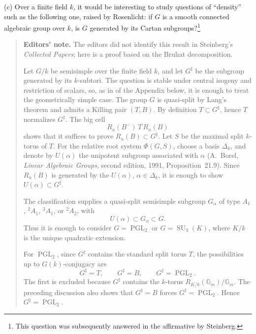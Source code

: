 \textup{(c)} Over a finite field \(k\), it would be interesting
to study questions of ``density'' such as the following one,
raised by Rosenlicht: if \(G\) is a smooth connected algebraic
group over \(k\), is \(G\) generated by its Cartan
subgroups?\footnote{This question was subsequently answered in
the affirmative by Steinberg.}

\begin{quote}\small
\textbf{Editors' note.}
The editors did not
identify this result in Steinberg's \emph{Collected Papers}; here
is a proof based on the Bruhat decomposition.

Let \(G/k\) be semisimple over the finite field \(k\), and let
\(G^\sharp\) be the subgroup generated by its \(k\)-subtori. The
question is stable under central isogeny and restriction of
scalars, so, as in  of the Appendix below, it is enough to
treat the geometrically simple case. The group \(G\) is
quasi-split by Lang's theorem and admits a Killing pair
\((T,B)\). By definition \(T\subset G^\sharp\), hence \(T\)
normalizes \(G^\sharp\). The big cell
\[
  R_u(B^-)\,T\,R_u(B)
\]
shows that it suffices to prove \(R_u(B)\subset G^\sharp\).
Let \(S\) be the maximal split \(k\)-torus of \(T\). For the
relative root system \(\Phi(G,S)\), choose a basis
\(\Delta_k\), and denote by \(U(\alpha)\) the unipotent subgroup
associated with \(\alpha\)
\textup{(A.~Borel, \emph{Linear Algebraic Groups}, second
edition, 1991, Proposition~21.9)}. Since \(R_u(B)\) is generated
by the \(U(\alpha)\), \(\alpha\in\Delta_k\), it is enough to
show \(U(\alpha)\subset G^\sharp\).

The classification supplies a quasi-split semisimple subgroup
\(G_\alpha\) of type \(A_1\), \({}^{2}A_1\), \({}^{3}A_1\), or
\({}^{2}A_2\), with
\[
  U(\alpha)\subset G_\alpha\subset G.
\]
Thus it is enough to consider \(G=\operatorname{PGL}_2\) or
\(G=\operatorname{SU}_3(K)\), where \(K/k\) is the unique
quadratic extension.

For \(\operatorname{PGL}_2\), since \(G^\sharp\) contains the
standard split torus \(T\), the possibilities up to
\(G(k)\)-conjugacy are
\[
  G^\sharp=T,\qquad G^\sharp=B,\qquad
  G^\sharp=\operatorname{PGL}_2.
\]
The first is excluded because \(G^\sharp\) contains the
\(k\)-torus \(R_{K/k}(\mathbb G_m)/\mathbb G_m\). The preceding
discussion also shows that \(G^\sharp=B\) forces
\(G^\sharp=\operatorname{PGL}_2\). Hence
\(G^\sharp=\operatorname{PGL}_2\).


\end{quote}
